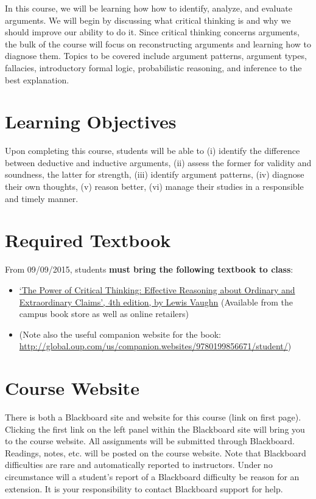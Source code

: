 \documentclass[article,oneside]{memoir}
\begin{document}
In this course, we will be learning how how to identify, analyze, and
evaluate arguments. We will begin by discussing what critical thinking
is and why we should improve our ability to do it. Since critical
thinking concerns arguments, the bulk of the course will focus on
reconstructing arguments and learning how to diagnose them. Topics to be covered include argument patterns, argument types, fallacies,
introductory formal logic, probabilistic reasoning, and inference to the best explanation.


\section{Learning Objectives}

Upon completing this course, students will be able to (i) identify the
difference between deductive and inductive arguments, (ii) assess the
former for validity and soundness, the latter for strength, (iii)
identify argument patterns, (iv) diagnose their own thoughts, (v) reason
better, (vi) manage their studies in a responsible and timely manner.

\section{Required Textbook}

From 09/09/2015, students \textbf{must bring the following textbook to class}:

\begin{itemize}
\item
  \href{http://www.amazon.com/Power-Critical-Thinking-Effective-Extraordinary/dp/0199856672/ref=sr_1_1?s=books\&ie=UTF8\&qid=1421936130\&sr=1-1\&keywords=critical+thinking+vaughn}{`The
  Power of Critical Thinking: Effective Reasoning about Ordinary and
  Extraordinary Claims', 4th edition, by Lewis Vaughn} (Available from
  the campus book store as well as online retailers)
\item (Note also the useful companion website for the book: \\  \href{http://global.oup.com/us/companion.websites/9780199856671/student/}{http://global.oup.com/us/companion.websites/9780199856671/student/})
\end{itemize}

\section{Course Website}
There is both a Blackboard site and website for this course (link on first page). Clicking the first link on the left panel within the Blackboard site will bring you to the course website. All assignments will be submitted through Blackboard. Readings, notes, etc. will be posted on the course website. Note that Blackboard difficulties are rare and automatically reported to instructors. Under no circumstance will a student's report of a Blackboard difficulty be reason for an extension. It is your responsibility to contact Blackboard support for help.
\end{document}
